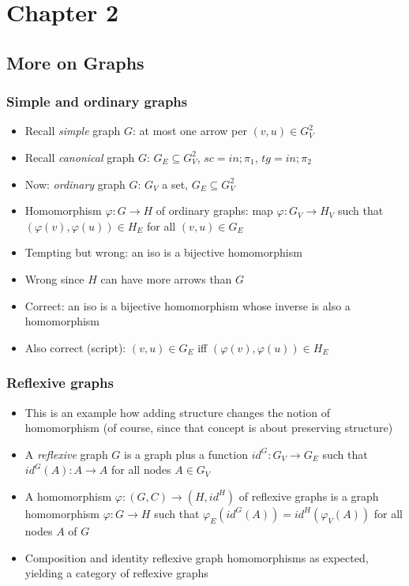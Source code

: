 \documentclass[handout]{beamer}
\begin{document}
\section{Chapter 2}
\subsection{More on Graphs}

\frame
  {   
    \frametitle{Simple and ordinary graphs}\label{Ch1:oGraph}

 \begin{itemize}[<+->]
\item Recall \emph{simple} graph $G$: at most one arrow per $(v,u)\in G_V^2$
\item Recall \emph{canonical} graph $G$:  $G_E\subseteq G_V^2$, $sc=in{;}\pi_1$, $tg=in{;}\pi_2$
\item Now: \emph{ordinary} graph $G$:  $G_V$ a set, $G_E\subseteq G_V^2$
\item Homomorphism $\varphi: G\to H$ of ordinary graphs: map $\varphi: G_V\to H_V$
such that $(\varphi(v),\varphi(u))\in H_E$ for all $(v,u)\in G_E$
\item Tempting but wrong: an iso is a bijective homomorphism
\item Wrong since $H$ can have more arrows than $G$
\item Correct: an iso is a bijective homomorphism whose inverse is also a homomorphism
\item Also correct (script): $(v,u)\in G_E$ iff $(\varphi(v),\varphi(u))\in H_E$
 \end{itemize}

 }

\frame
  {   
    \frametitle{Reflexive graphs}\label{Ch1:rGraph}

 \begin{itemize}[<+->]
\item This is an example how adding structure changes the notion of homomorphism
(of course, since that concept is about preserving structure)
\item A \emph{reflexive} graph $G$ is a graph plus a function $id^G : G_V \to G_E$
such that $id^G(A): A \to A$ for all nodes $A\in G_V$
\item A homomorphism $\varphi: (G,C)\to (H,id^H)$ of reflexive graphs
is a graph homomorphism $\varphi: G\to H$ such 
that $\varphi_E(id^G(A)) = id^H(\varphi_V(A))$ for all nodes $A$ of $G$
\item Composition and identity reflexive graph homomorphisms as expected,
yielding a category of reflexive graphs
 \end{itemize}

 }
\end{document}

